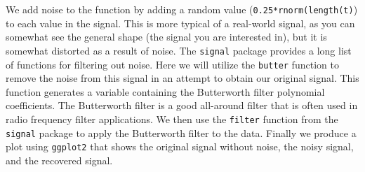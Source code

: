\documentclass[12pt,oneside]{book}\usepackage[]{graphicx}\usepackage[]{color}
\begin{document}
{{{{We add noise to the function by adding a random value (\verb+0.25*rnorm(length(t)+) to each value in the signal. This is more typical of a real-world signal, as you can somewhat see the general shape (the signal you are interested in), but it is somewhat distorted as a result of noise. The \verb+signal+ package provides a long list of functions for filtering out noise. Here we will utilize the \verb+butter+ function to remove the noise from this signal in an attempt to obtain our original signal. This function generates a variable containing the Butterworth filter polynomial coefficients. The Butterworth filter is a good all-around filter that is often used in radio frequency filter applications. We then use the \verb+filter+ function from the \verb+signal+ package to apply the Butterworth filter to the data. Finally we produce a plot using \verb+ggplot2+ that shows the original signal without noise, the noisy signal, and the recovered signal. 

}}}}
\end{document}
